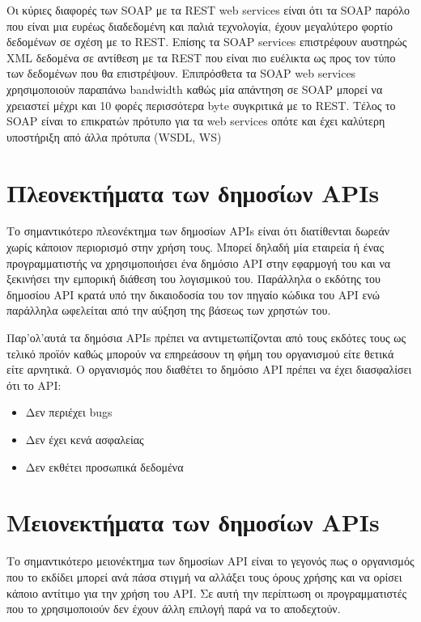 \documentclass[oneside, 12pt]{book}
\begin{document}
Οι κύριες διαφορές των SOAP με τα REST web services είναι ότι τα SOAP 
παρόλο που είναι μια ευρέως διαδεδομένη και παλιά τεχνολογία,  έχουν 
μεγαλύτερο φορτίο δεδομένων σε σχέση με το REST. Επίσης τα SOAP 
services επιστρέφουν αυστηρώς XML δεδομένα σε αντίθεση με τα REST που 
είναι πιο ευέλικτα ως προς τον τύπο των δεδομένων που θα επιστρέψουν. 
Επιπρόσθετα τα SOAP web services χρησιμοποιούν παραπάνω bandwidth 
καθώς μία απάντηση σε SOAP μπορεί να χρειαστεί μέχρι και 10 φορές 
περισσότερα byte συγκριτικά με το REST. Τέλος το SOAP είναι το 
επικρατών πρότυπο για τα web services οπότε και έχει καλύτερη 
υποστήριξη από άλλα πρότυπα (WSDL, WS) \cite{wagh2012comparative}

\section{Πλεονεκτήματα των δημοσίων APIs}
Το σημαντικότερο πλεονέκτημα των δημοσίων APIs είναι ότι διατίθενται 
δωρεάν χωρίς κάποιον περιορισμό στην χρήση τους. Μπορεί δηλαδή μία 
εταιρεία ή ένας προγραμματιστής να χρησιμοποιήσει ένα δημόσιο API στην 
εφαρμογή του και να ξεκινήσει την εμπορική διάθεση του λογισμικού του.
Παράλληλα ο εκδότης του δημοσίου API κρατά υπό την δικαιοδοσία του τον 
πηγαίο κώδικα του API ενώ παράλληλα ωφελείται από την αύξηση της 
βάσεως των χρηστών του.

Παρ'ολ'αυτά τα δημόσια APIs πρέπει να αντιμετωπίζονται από τους εκδότες 
τους ως τελικό προϊόν καθώς μπορούν να επηρεάσουν τη φήμη του 
οργανισμού είτε θετικά είτε αρνητικά.
Ο οργανισμός που διαθέτει το δημόσιο API πρέπει να έχει διασφαλίσει 
ότι το API:
\begin{itemize} %
\item Δεν περιέχει bugs 
\item Δεν έχει κενά ασφαλείας
\item Δεν εκθέτει προσωπικά δεδομένα
\end{itemize}

\section{Μειονεκτήματα των δημοσίων APIs}
Το σημαντικότερο μειονέκτημα των δημοσίων API είναι το γεγονός πως ο 
οργανισμός που το εκδίδει μπορεί ανά πάσα στιγμή να αλλάξει τους όρους 
χρήσης και να ορίσει κάποιο αντίτιμο για την χρήση του API. Σε αυτή 
την περίπτωση οι προγραμματιστές που το χρησιμοποιούν δεν έχουν άλλη 
επιλογή παρά να το αποδεχτούν.
\end{document}
